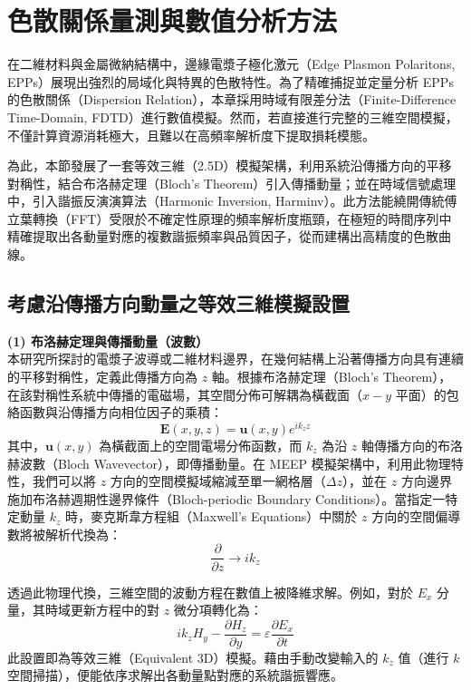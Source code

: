 \section{色散關係量測與數值分析方法}
\label{sec:dispersion_method}
在二維材料與金屬微納結構中，邊緣電漿子極化激元（Edge Plasmon Polaritons, EPPs）展現出強烈的局域化與特異的色散特性。為了精確捕捉並定量分析 EPPs 的色散關係（Dispersion Relation），本章採用時域有限差分法（Finite-Difference Time-Domain, FDTD）進行數值模擬。然而，若直接進行完整的三維空間模擬，不僅計算資源消耗極大，且難以在高頻率解析度下提取損耗模態。

為此，本節發展了一套等效三維（2.5D）模擬架構，利用系統沿傳播方向的平移對稱性，結合布洛赫定理（Bloch's Theorem）引入傳播動量；並在時域信號處理中，引入諧振反演演算法（Harmonic Inversion, Harminv）。此方法能繞開傳統傅立葉轉換（FFT）受限於不確定性原理的頻率解析度瓶頸，在極短的時間序列中精確提取出各動量對應的複數諧振頻率與品質因子，從而建構出高精度的色散曲線。

\subsection{考慮沿傳播方向動量之等效三維模擬設置}

\noindent \textbf{(1) 布洛赫定理與傳播動量（波數）} \\
本研究所探討的電漿子波導或二維材料邊界，在幾何結構上沿著傳播方向具有連續的平移對稱性，定義此傳播方向為 $z$ 軸。根據布洛赫定理（Bloch's Theorem），在該對稱性系統中傳播的電磁場，其空間分佈可解耦為橫截面（$x-y$ 平面）的包絡函數與沿傳播方向相位因子的乘積：
\begin{equation}
	\mathbf{E}(x, y, z) = \mathbf{u}(x, y) e^{i k_z z}
\end{equation}
其中，$\mathbf{u}(x, y)$ 為橫截面上的空間電場分佈函數，而 $k_z$ 為沿 $z$ 軸傳播方向的布洛赫波數（Bloch Wavevector），即傳播動量。在 MEEP 模擬架構中，利用此物理特性，我們可以將 $z$ 方向的空間模擬域縮減至單一網格層（$\Delta z$），並在 $z$ 方向邊界施加布洛赫週期性邊界條件（Bloch-periodic Boundary Conditions）。當指定一特定動量 $k_z$ 時，麥克斯韋方程組（Maxwell's Equations）中關於 $z$ 方向的空間偏導數將被解析代換為：
\begin{equation}
	\frac{\partial}{\partial z} \longrightarrow i k_z
\end{equation}

透過此物理代換，三維空間的波動方程在數值上被降維求解。例如，對於 $E_x$ 分量，其時域更新方程中的對 $z$ 微分項轉化為：
\begin{equation}
	i k_z H_y - \frac{\partial H_z}{\partial y} = \varepsilon \frac{\partial E_x}{\partial t}
\end{equation}
此設置即為等效三維（Equivalent 3D）模擬。藉由手動改變輸入的 $k_z$ 值（進行 $k$ 空間掃描），便能依序求解出各動量點對應的系統諧振響應。

